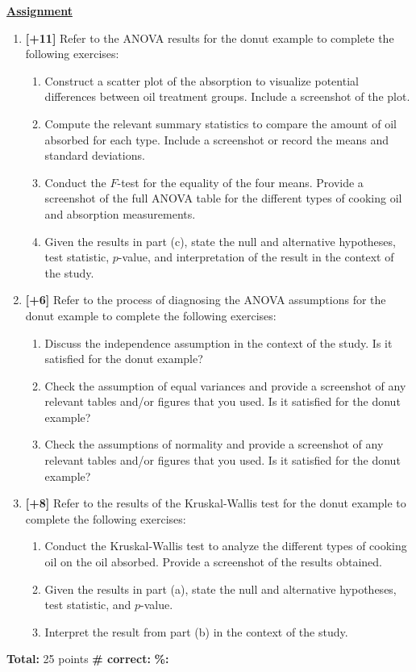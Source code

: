 \documentclass[11pt]{article}
\begin{document}
\textbf{\underline{Assignment}}
\begin{enumerate}
\item \textbf{[+11]} Refer to the ANOVA results for the donut example to complete the following exercises:
	\begin{enumerate}
	\item Construct a scatter plot of the absorption to visualize potential differences between oil treatment groups. Include a screenshot of the plot.
	\item Compute the relevant summary statistics to compare the amount of oil absorbed for each type. Include a screenshot or record the means and standard deviations.
	\item Conduct the $F$-test for the equality of the four means. Provide a screenshot of the full ANOVA table for the different types of cooking oil and absorption measurements. 
	\item Given the results in part (c), state the null and alternative hypotheses, test statistic, $p$-value, and interpretation of the result in the context of the study.
	\end{enumerate}
\item \textbf{[+6]} Refer to the process of diagnosing the ANOVA assumptions for the donut example to complete the following exercises:
	\begin{enumerate}
	\item Discuss the independence assumption in the context of the study. Is it satisfied for the donut example?
	\item Check the assumption of equal variances and provide a screenshot of any relevant tables and/or figures that you used. Is it satisfied for the donut example?
	\item Check the assumptions of normality and provide a screenshot of any relevant tables and/or figures that you used. Is it satisfied for the donut example?
	\end{enumerate}
\item \textbf{[+8]} Refer to the results of the Kruskal-Wallis test for the donut example to complete the following exercises:
	\begin{enumerate}
	\item Conduct the Kruskal-Wallis test to analyze the different types of cooking oil on the oil absorbed. Provide a screenshot of the results obtained. 
	\item Given the results in part (a), state the null and alternative hypotheses, test statistic, and $p$-value. 
	\item Interpret the result from part (b) in the context of the study.
	\end{enumerate}
\end{enumerate}

\vfill
\textbf{Total:} 25 points \hspace{14pt} \textbf{\# correct:} \underline{\hspace{1in}}  \hspace{14pt} \textbf{\%:} \underline{\hspace{1in}} 
\end{document}
